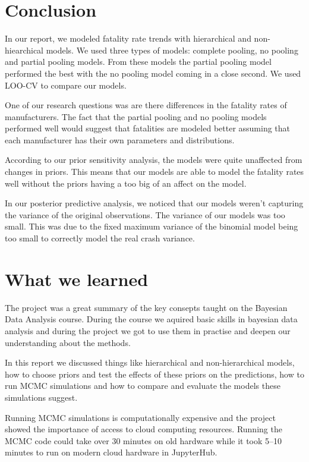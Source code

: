 \documentclass[12pt,a4paper]{article}
\begin{document}
\section{Conclusion}

In our report, we modeled fatality rate trends with hierarchical and non-hiearchical models. We used three types of models: complete pooling, no pooling and partial pooling models. From these models the partial pooling model performed the best with the no pooling model coming in a close second. We used LOO-CV to compare our models.

One of our research questions was are there differences in the fatality rates of manufacturers. The fact that the partial pooling and no pooling models performed well would suggest that fatalities are modeled better assuming that each manufacturer has their own parameters and distributions.

According to our prior sensitivity analysis, the models were quite unaffected from changes in priors. This means that our models are able to model the fatality rates well without the priors having a too big of an affect on the model.

In our posterior predictive analysis, we noticed that our models weren't capturing the variance of the original observations. The variance of our models was too small. This was due to the fixed maximum variance of the binomial model being too small to correctly model the real crash variance.

\section{What we learned}

The project was a great summary of the key consepts taught on the Bayesian Data Analysis course. During the course we aquired basic skills in bayesian data analysis and during the project we got to use them in practise and deepen our understanding about the methods.

In this report we discussed things like hierarchical and non-hierarchical models, how to choose priors and test the effects of these priors on the predictions, how to run MCMC simulations and how to compare and evaluate the models these simulations suggest.

Running MCMC simulations is computationally expensive and the project showed the importance of access to cloud computing resources. Running the MCMC code could take over 30 minutes on old hardware while it took 5--10 minutes to run on modern cloud hardware in JupyterHub.


\printbibliography
\end{document}
